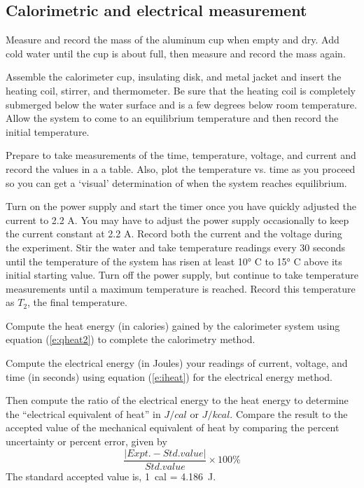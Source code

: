 \subsection{Calorimetric and electrical measurement}

Measure and record the mass of the aluminum cup when empty and dry.
Add cold water until the cup is about  full, then measure and record the mass again.

Assemble the calorimeter cup, insulating disk, and metal jacket and insert the heating coil, stirrer, and thermometer.  Be sure that the heating coil is completely submerged below the water surface and is a few degrees below room temperature. Allow the system to come to an equilibrium temperature and then record the initial temperature.

Prepare to take measurements of the time, temperature, voltage, and current and record the values in a a table. Also, plot the temperature vs. time as you proceed so you can get a `visual' determination of when the system reaches equilibrium.

Turn on the power supply and start the timer once you have quickly adjusted the current to 2.2 A.  You may have to adjust the power supply occasionally to keep the current constant at 2.2 A.  Record both the current and the voltage during the experiment.  Stir the water and take temperature readings every 30 seconds until the temperature of the system has risen at least \ang{10} C to \ang{15} C above its initial starting value.  Turn off the power supply, but continue to take temperature measurements %
until a maximum temperature is reached. Record this temperature as $T_2$, the final temperature.

Compute the heat energy (in calories) gained by the calorimeter system using equation (\ref{e:qheat2}) to complete the calorimetry method. %

Compute the electrical energy (in Joules) your readings of current, voltage, and time (in seconds) using equation (\ref{e:iheat}) for the electrical energy  method.

Then compute the ratio of the electrical energy to the heat energy to determine the ``electrical equivalent of heat'' in $J/cal$ or $J/kcal$. Compare the result to the accepted value of the mechanical equivalent of heat by comparing the percent uncertainty or percent error, given by
\[ \frac{|Expt. - Std. value|}{Std. value} \times 100\% \]
 The standard accepted value is, 1~cal = 4.186~J.

